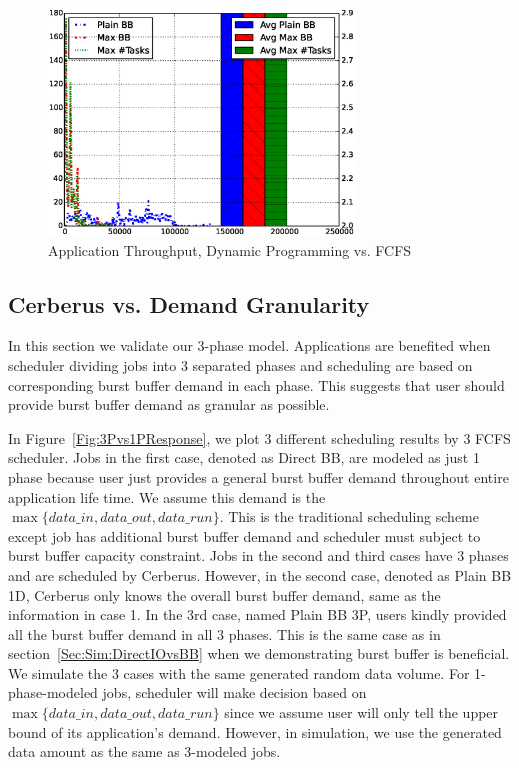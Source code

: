 \begin{figure}[!t]
\centering
\includegraphics[width=3.2in]{DrawDPvsFIFO/1000jobs_dp_vs_fifo_throughput}
\caption{Application Throughput, Dynamic Programming vs. FCFS}
\label{Fig:DPvsFIFOThroughput}
\end{figure}


\subsection{Cerberus vs. Demand Granularity}
In this section we validate our 3-phase model.
Applications are benefited when scheduler dividing jobs into 3 separated phases and 
scheduling are based on corresponding burst buffer demand in each phase.
This suggests that user should provide burst buffer demand as granular as possible.

In Figure~\ref{Fig:3Pvs1PResponse}, we plot 3 different scheduling results by 3 FCFS scheduler.
Jobs in the first case, denoted as Direct BB, are modeled as just 1 phase because user just provides
a general burst buffer demand throughout entire application life time.
We assume this demand is the $\max \{data\_in, data\_out, data\_run\}$.
This is the traditional scheduling scheme except job has additional
burst buffer demand and scheduler must subject to burst buffer capacity constraint.
Jobs in the second and third cases have 3 phases and are scheduled by Cerberus.
However, in the second case, denoted as Plain BB 1D, Cerberus only knows the overall burst buffer demand,
same as the information in case 1.
In the 3rd case, named Plain BB 3P, users kindly provided all the burst buffer demand in all 3 phases.
This is the same case as in section~\ref{Sec:Sim:DirectIOvsBB} when we demonstrating burst buffer is beneficial.
We simulate the 3 cases with the same generated random data volume.
For 1-phase-modeled jobs, scheduler will make decision based on $\max \{data\_in, data\_out, data\_run\}$
since we assume user will only tell the upper bound of its application's demand.
However, in simulation, we use the generated data amount as the same as 3-modeled jobs.

